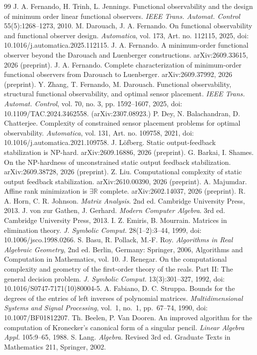 \documentclass[journal]{IEEEtran}
\theoremstyle{plainn}
\theoremstyle{remark}
\begin{document}
\begin{thebibliography}{99}
 J. A. Fernando, H. Trinh, L. Jennings. Functional observability and the design of minimum order linear functional observers. \emph{IEEE Trans. Automat. Control} 55(5):1268--1273, 2010.
 M. Darouach, J. A. Fernando. On functional observability and functional observer design. \emph{Automatica}, vol. 173, Art. no. 112115, 2025, doi: 10.1016/j.automatica.2025.112115.
 J. A. Fernando. A minimum-order functional observer beyond the Darouach and Luenberger constructions. arXiv:2609.33615, 2026 (preprint).
 J. A. Fernando. Complete characterization of minimum-order functional observers from Darouach to Luenberger. arXiv:2609.37992, 2026 (preprint).
 Y. Zhang, T. Fernando, M. Darouach. Functional
  observability, structural functional observability, and optimal sensor
  placement. \emph{IEEE Trans. Automat. Control}, vol. 70, no. 3,
  pp. 1592--1607, 2025, doi: 10.1109/TAC.2024.3462558.
  (arXiv:2307.08923.)
 P. Dey, N. Balachandran, D. Chatterjee. Complexity of
  constrained sensor placement problems for optimal observability.
  \emph{Automatica}, vol. 131, Art. no. 109758, 2021,
  doi: 10.1016/j.automatica.2021.109758.
 J. L\"{o}fberg. Static output-feedback stabilization is
  NP-hard. arXiv:2609.16886, 2026 (preprint).
 G. Barkai, I. Shames. On the NP-hardness of unconstrained
  static output feedback stabilization. arXiv:2609.38728, 2026 (preprint).
 Z. Liu. Computational complexity of static output feedback
  stabilization. arXiv:2610.00390, 2026 (preprint).
 A. Majumdar. Affine rank minimization is
  $\exists\mathbb R$ complete. arXiv:2602.14037, 2026 (preprint).
 R. A. Horn, C. R. Johnson. \emph{Matrix Analysis}. 2nd ed.
Cambridge University Press, 2013.
 J. von zur Gathen, J. Gerhard. \emph{Modern Computer Algebra}.
3rd ed. Cambridge University Press, 2013.
 I. Z. Emiris, B. Mourrain. Matrices in elimination theory. \emph{J. Symbolic Comput.} 28(1--2):3--44, 1999, doi: 10.1006/jsco.1998.0266.
 S. Basu, R. Pollack, M.-F. Roy. \emph{Algorithms in Real
  Algebraic Geometry}, 2nd ed. Berlin, Germany: Springer, 2006,
  Algorithms and Computation in Mathematics, vol. 10.
 J. Renegar. On the computational complexity and geometry of the first-order theory of the reals. Part II: The general decision problem. \emph{J. Symbolic Comput.} 13(3):301--327, 1992, doi: 10.1016/S0747-7171(10)80004-5.
 A. Fabiano, D. C. Struppa. Bounds for the degrees of the entries of left
inverses of polynomial matrices. \emph{Multidimensional Systems and Signal Processing},
vol.~1, no.~1, pp.~67--74, 1990, doi: 10.1007/BF01812207.
 Th. Beelen, P. Van Dooren. An improved algorithm for the computation of Kronecker's canonical form of a singular pencil. \emph{Linear Algebra Appl.} 105:9--65, 1988.
 S. Lang. \emph{Algebra}. Revised 3rd ed.
Graduate Texts in Mathematics 211, Springer, 2002.
\end{thebibliography}
\end{document}

